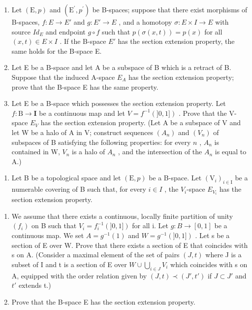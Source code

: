 \begin{enumerate}
\def\labelenumi{\alph{enumi})}
\item
  Let \((\mathrm{E},p)\) and \((\mathrm{E}^{\prime},p^{\prime})\) be B-spaces; suppose that there exist morphisms of B-spaces, \(f: E \to E'\) and \(g: E' \to E\) , and a homotopy \(\sigma: E \times I \to E\) with source \(Id_{E}\) and endpoint \(g \circ f\) such that \(p(\sigma(x,t)) = p(x)\) for all \((x,t) \in E \times I\) . If the B-space \(E'\) has the section extension property, the same holds for the B-space E.
\item
  Let E be a B-space and let A be a subspace of B which is a retract of B. Suppose that the induced A-space \(E_{A}\) has the section extension property; prove that the B-space E has the same property.
\item
  Let E be a B-space which possesses the section extension property. Let \(f \colon \mathrm{B} \to \mathbf{I}\) be a continuous map and let \(V = f^{-1}(]0,1])\) . Prove that the V-space \(E_V\) has the section extension property. (Let A be a subspace of V and let W be a halo of A in V; construct sequences \((A_n)\) and \((V_n)\) of subspaces of B satisfying the following properties: for every \(n\) , \(A_n\) is contained in W, \(V_n\) is a halo of \(A_n\) , and the intersection of the \(A_n\) is equal to A.)
\end{enumerate}

\begin{enumerate}
\def\labelenumi{\arabic{enumi})}
\setcounter{enumi}{31}
\tightlist
\item
  Let B be a topological space and let \((\mathrm{E},p)\) be a B-space. Let \((\mathrm{V}_{i})_{i\in\mathrm{I}}\) be a numerable covering of B such that, for every \(i\in I\) , the \(V_{i}\)-space \(E_{V_{i}}\) has the section extension property.
\end{enumerate}

\begin{enumerate}
\def\labelenumi{\alph{enumi})}
\item
  We assume that there exists a continuous, locally finite partition of unity \((f_{i})\) on B such that \(V_{i} = f_{i}^{-1}(]0,1])\) for all i. Let \(g: B \to [0,1]\) be a continuous map. We set \(A = g^{-1}(1)\) and \(W = g^{-1}(]0,1])\) . Let s be a section of E over W. Prove that there exists a section of E that coincides with s on A. (Consider a maximal element of the set of pairs \((J,t)\) where J is a subset of I and t is a section of E over \(W \cup \bigcup_{i \in J} V_{i}\) which coincides with s on A, equipped with the order relation given by \((J,t) \prec (J',t')\) if \(J \subset J'\) and \(t'\) extends t.)
\item
  Prove that the B-space E has the section extension property.
\end{enumerate}

